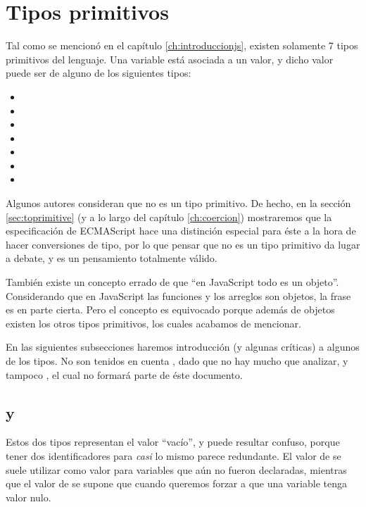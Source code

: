 \section{Tipos primitivos}

Tal como se mencionó en el capítulo \ref{ch:introduccionjs}, existen solamente 7 tipos primitivos del lenguaje. Una variable está asociada a un valor, y dicho valor puede ser de alguno de los siguientes tipos:

\begin{itemize}
\item {}
\item {}
\item {}
\item {}
\item {}
\item {}
\item {}
\end{itemize}

Algunos autores consideran que  no es un tipo primitivo. De hecho, en la sección \ref{sec:toprimitive} (y a lo largo del capítulo \ref{ch:coercion}) mostraremos que la especificación de ECMAScript \cite{EcmaScript:15} hace una distinción especial para éste a la hora de hacer conversiones de tipo, por lo que pensar que  no es un tipo primitivo da lugar a debate, y es un pensamiento totalmente válido.

También existe un concepto errado de que "`en JavaScript todo es un objeto"'. Considerando que en JavaScript las funciones y los arreglos son objetos, la frase es en parte cierta. Pero el concepto es equivocado porque además de objetos existen los otros tipos primitivos, los cuales acabamos de mencionar.

En las siguientes subsecciones haremos introducción (y algunas críticas) a algunos de los tipos. No son tenidos en cuenta , dado que no hay mucho que analizar, y tampoco , el cual no formará parte de éste documento.

\subsection{ y }

Estos dos tipos representan el valor "`vacío"', y puede resultar confuso, porque tener dos identificadores para \textit{casi} lo mismo parece redundante. El valor de  se suele utilizar como valor para variables que aún no fueron declaradas, mientras que el valor de  se supone que cuando queremos forzar a que una variable tenga valor nulo.

